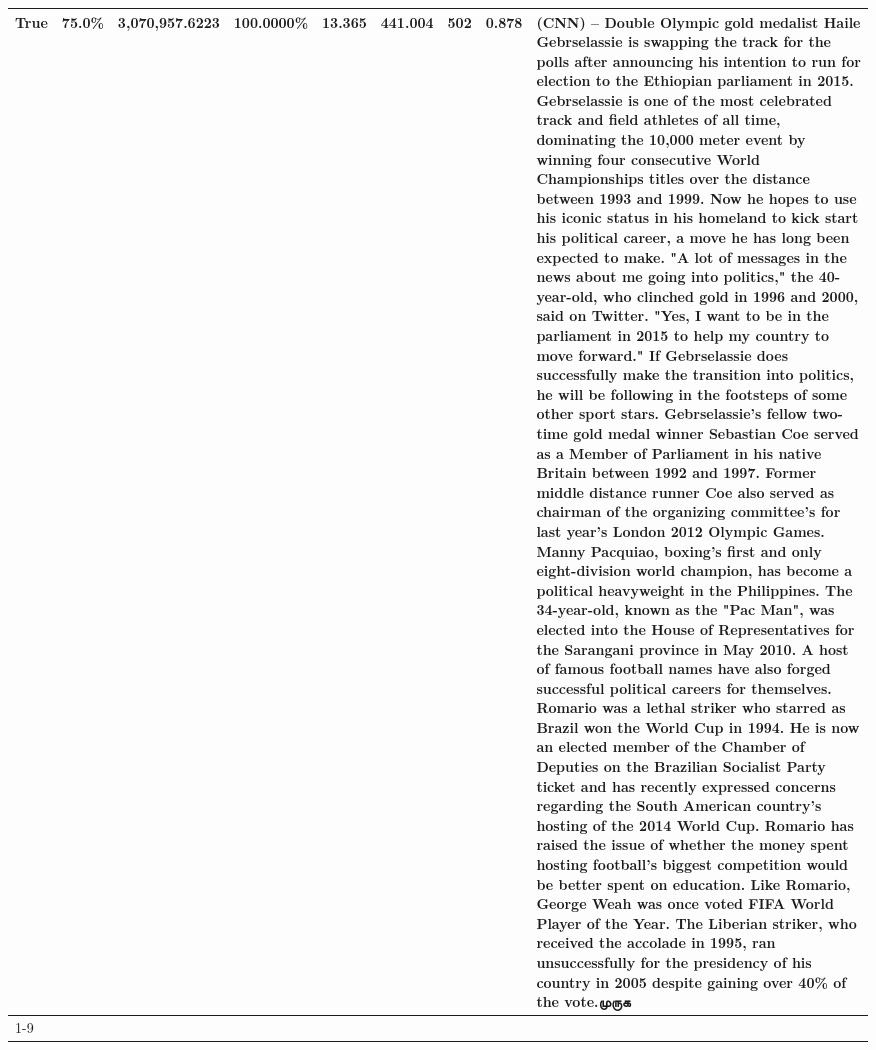 \begin{table}[H]
{\begin{tabular}{lllrlllll}
True & 75.0\% & 3,070,957.6223 & \bfseries \color{red} 100.0000\% & 13.365 & 441.004 & 502 & 0.878 & (CNN) -- Double Olympic gold medalist Haile Gebrselassie is swapping the track for the polls after announcing his intention to run for election to the Ethiopian parliament in 2015. Gebrselassie is one of the most celebrated track and field athletes of all time, dominating the 10,000 meter event by winning four consecutive World Championships titles over the distance between 1993 and 1999. Now he hopes to use his iconic status in his homeland to kick start his political career, a move he has long been expected to make. "A lot of messages in the news about me going into politics," the 40-year-old, who clinched gold in 1996 and 2000, said on Twitter. "Yes, I want to be in the parliament in 2015 to help my country to move forward." If Gebrselassie does successfully make the transition into politics, he will be following in the footsteps of some other sport stars. Gebrselassie's fellow two-time gold medal winner Sebastian Coe served as a Member of Parliament in his native Britain between 1992 and 1997. Former middle distance runner Coe also served as chairman of the organizing committee's for last year's London 2012 Olympic Games. Manny Pacquiao, boxing's first and only eight-division world champion, has become a political heavyweight in the Philippines. The 34-year-old, known as the "Pac Man", was elected into the House of Representatives for the Sarangani province in May 2010. A host of famous football names have also forged successful political careers for themselves. Romario was a lethal striker who starred as Brazil won the World Cup in 1994. He is now an elected member of the Chamber of Deputies on the Brazilian Socialist Party ticket and has recently expressed concerns regarding the South American country's hosting of the 2014 World Cup. Romario has raised the issue of whether the money spent hosting football's biggest competition would be better spent on education. Like Romario, George Weah was once voted FIFA World Player of the Year. The Liberian striker, who received the accolade in 1995, ran unsuccessfully for the presidency of his country in 2005 despite gaining over 40\% of the vote.முருக \\
\cline{1-9}

\end{tabular}}
\end{table}
